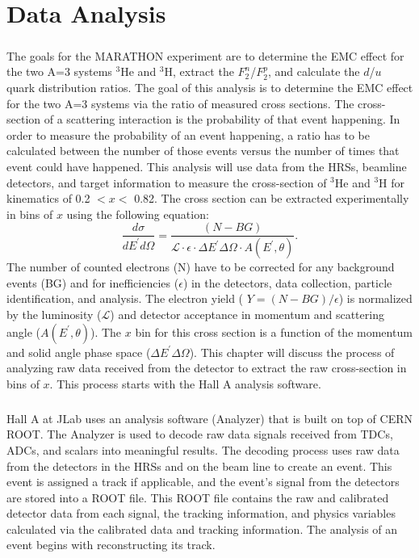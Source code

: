 	\chapter{Data Analysis}
\paragraph{}The goals for the MARATHON experiment are to determine the EMC effect for the two A=3 systems $^3$He and $^3$H, extract the  $F_2^n$/$F_2^p$, and calculate the $d$/$u$ quark distribution ratios. The goal of this analysis is to determine the EMC effect for the two A=3 systems via the ratio of measured cross sections. The cross-section of a scattering interaction is the probability of that event happening. In order to measure the probability of an event happening, a ratio has to be calculated between the number of those events versus the number of times that event could have happened. This analysis will use data from the HRSs, beamline detectors, and target information to measure the cross-section of $^3$He and $^3$H for kinematics of 0.2 $< x <$ 0.82. The cross section can be extracted experimentally in bins of $x$ using the following equation:
\begin{equation}
\dfrac{d\sigma}{dE^{\prime}d\Omega} = \frac{(N - BG)}{\mathscr{L} \cdot \epsilon \cdot \Delta E^{\prime} \Delta \Omega \cdot A(E^{\prime},\theta)}. \label{expcc}
\end{equation}
The number of counted electrons (N) have to be corrected for any background events (BG) and for inefficiencies ($\epsilon$) in the detectors, data collection, particle identification, and analysis. The electron yield ( $Y=(N-BG)/\epsilon$) is normalized by the luminosity ($\mathscr{L}$) and detector acceptance in momentum and scattering angle ($A(E^{\prime},\theta)$). The $x$ bin for this cross section is a function of the momentum and solid angle phase space ($\Delta E^{\prime} \Delta \Omega$). This chapter will discuss the process of analyzing raw data received from the detector to extract the raw cross-section in bins of $x$. This process starts with the Hall A analysis software.  
\paragraph{}Hall A at JLab uses an analysis software (Analyzer) that is built on top of CERN ROOT. The Analyzer is used to decode raw data signals received from TDCs, ADCs, and scalars into meaningful results. The decoding process uses raw data from the detectors in the HRSs and on the beam line to create an event. This event is assigned a track if applicable, and the event's signal from the detectors are stored into a ROOT file. This ROOT file contains the raw and calibrated detector data from each signal, the tracking information, and physics variables calculated via the calibrated data and tracking information. The analysis of an event begins with reconstructing its track. 

